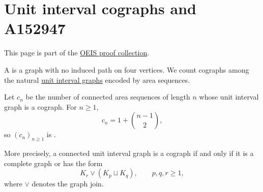 

\section[oeisProofA152947]{Unit interval cographs and A152947}

This page is part of the \hyperref[oeisProofs]{OEIS proof collection}.

A  is a graph with no induced path on four vertices.
We count cographs among the natural
\hyperref[chromaticQuasisymmetricUnitIntervalGraph]{unit interval graphs}
encoded by area sequences.

\begin{theorem}
Let $c_n$ be the number of connected area sequences of length $n$ whose
unit interval graph is a cograph.  For $n \geq 1$,
\[
c_n=1+\binom{n-1}{2},
\]
so $(c_n)_{n\geq1}$ is .

More precisely, a connected unit interval graph is a cograph if and only if
it is a complete graph or has the form
\[
K_r \mathbin{\vee} (K_p \mathbin{\sqcup} K_q),
\qquad p,q,r\geq1,
\]
where $\vee$ denotes the graph join.
\end{theorem}

